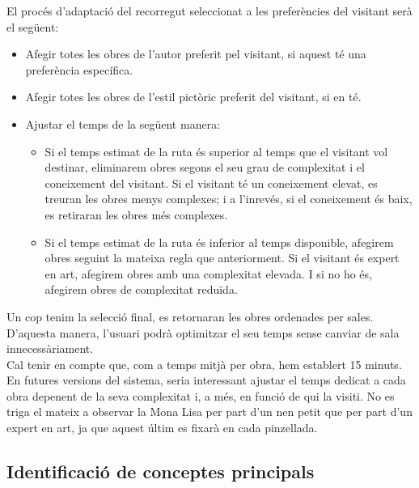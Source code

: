 \documentclass[a4paper]{article}
\begin{document}
	El procés d'adaptació del recorregut seleccionat a les preferències del visitant serà el següent:
	\begin{itemize}
		\item Afegir totes les obres de l'autor preferit pel visitant, si aquest té una preferència específica.
		\item Afegir totes les obres de l'estil pictòric preferit del visitant, si en té.
		\item Ajustar el temps de la següent manera: 
		\begin{itemize}
			\item Si el temps estimat de la ruta és superior al temps que el visitant vol destinar, eliminarem obres segons el seu grau de complexitat i el coneixement del visitant. Si el visitant té un coneixement elevat, es treuran les obres menys complexes; i a l'inrevés, si el coneixement és baix, es retiraran les obres més complexes.
			\item Si el temps estimat de la ruta és inferior al temps disponible, afegirem obres seguint la mateixa regla que anteriorment. Si el visitant és expert en art, afegirem obres amb una complexitat elevada. I si no ho és, afegirem obres de complexitat reduïda.
		\end{itemize}
	\end{itemize}
	
	Un cop tenim la selecció final, es retornaran les obres ordenades per sales. D'aquesta manera, l'usuari podrà optimitzar el seu temps sense canviar de sala innecessàriament. \\
	
	Cal tenir en compte que, com a temps mitjà per obra, hem establert 15 minuts. En futures versions del sistema, seria interessant ajustar el temps dedicat a cada obra depenent de la seva complexitat i, a més, en funció de qui la visiti. No es triga el mateix a observar la Mona Lisa per part d'un nen petit que per part d'un expert en art, ja que aquest últim es fixarà en cada pinzellada.
	
	\subsection{Identificació de conceptes principals}
	
\end{document}

